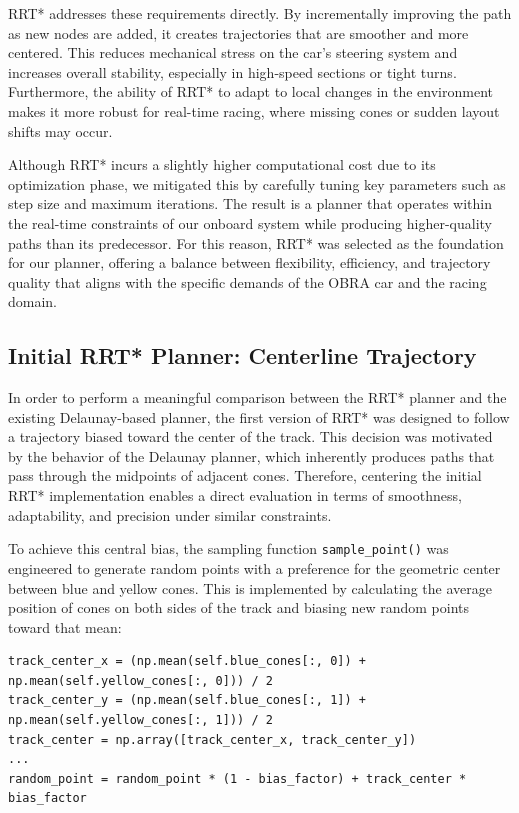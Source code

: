 \documentclass[a4paper,11pt]{report}
\begin{document}
RRT* addresses these requirements directly. By incrementally improving the path as new nodes are added, it creates trajectories that are smoother and more centered. This reduces mechanical stress on the car's steering system and increases overall stability, especially in high-speed sections or tight turns. Furthermore, the ability of RRT* to adapt to local changes in the environment makes it more robust for real-time racing, where missing cones or sudden layout shifts may occur. 

Although RRT* incurs a slightly higher computational cost due to its optimization phase, we mitigated this by carefully tuning key parameters such as step size and maximum iterations. The result is a planner that operates within the real-time constraints of our onboard system while producing higher-quality paths than its predecessor. For this reason, RRT* was selected as the foundation for our planner, offering a balance between flexibility, efficiency, and trajectory quality that aligns with the specific demands of the OBRA car and the racing domain.


\subsection{Initial RRT* Planner: Centerline Trajectory}

In order to perform a meaningful comparison between the RRT* planner and the existing Delaunay-based planner, the first version of RRT* was designed to follow a trajectory biased toward the center of the track. This decision was motivated by the behavior of the Delaunay planner, which inherently produces paths that pass through the midpoints of adjacent cones. Therefore, centering the initial RRT* implementation enables a direct evaluation in terms of smoothness, adaptability, and precision under similar constraints.

To achieve this central bias, the sampling function \texttt{sample\_point()} was engineered to generate random points with a preference for the geometric center between blue and yellow cones. This is implemented by calculating the average position of cones on both sides of the track and biasing new random points toward that mean:

\begin{verbatim}
track_center_x = (np.mean(self.blue_cones[:, 0]) + np.mean(self.yellow_cones[:, 0])) / 2
track_center_y = (np.mean(self.blue_cones[:, 1]) + np.mean(self.yellow_cones[:, 1])) / 2
track_center = np.array([track_center_x, track_center_y])
...
random_point = random_point * (1 - bias_factor) + track_center * bias_factor
\end{verbatim}
\end{document}
